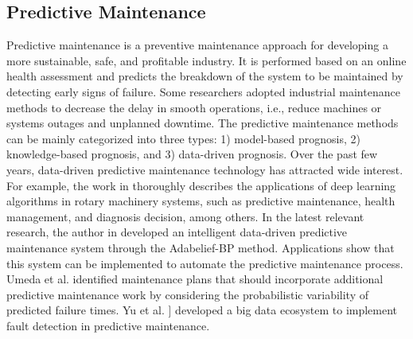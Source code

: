 \documentclass[11pt]{article}
\begin{document}
\subsection{Predictive Maintenance}
\par{Predictive maintenance is a preventive maintenance approach for developing a more sustainable, safe, and profitable industry.
It is performed based on an online health assessment and predicts the breakdown of the system to be maintained by detecting early signs of failure.
Some researchers \cite{bib29} adopted industrial maintenance methods to decrease the delay in smooth operations, i.e., reduce machines or systems outages and unplanned downtime.
The predictive maintenance methods can be mainly categorized into three types: 1) model-based prognosis, 2) knowledge-based prognosis, and 3) data-driven prognosis.
Over the past few years, data-driven predictive maintenance technology has attracted wide interest.
For example, the work in \cite{bib30} thoroughly describes the applications of deep learning algorithms in rotary machinery systems, such as predictive maintenance, health management, and diagnosis decision, among others.
In the latest relevant research, the author in \cite{bib31} developed an intelligent data-driven predictive maintenance system through the Adabelief-BP method.
Applications show that this system can be implemented to automate the predictive maintenance process.
Umeda et al. \cite{bib32} identified maintenance plans that should incorporate additional predictive maintenance work by considering the probabilistic variability of predicted failure times.
Yu et al. \cite{bib33}] developed a big data ecosystem to implement fault detection in predictive maintenance. }
\end{document}
